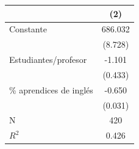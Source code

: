 \begin{tabular}[t]{lc}
\toprule
  & (2)\\
\midrule
Constante & 686.032\\
 & (8.728)\\
Estudiantes/profesor & -1.101\\
 & (0.433)\\
\% aprendices de inglés & -0.650\\
 & (0.031)\\
\midrule
N & 420\\
$R^2$ & 0.426\\
\bottomrule
\end{tabular}
